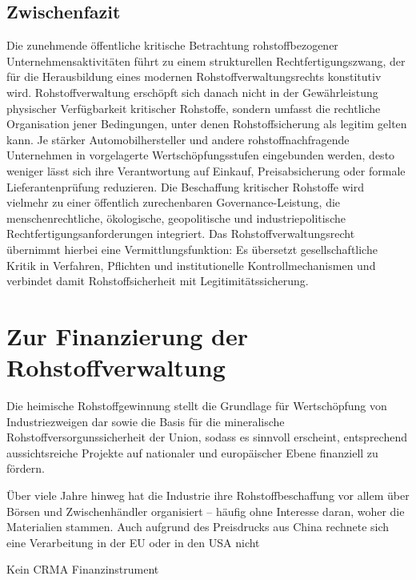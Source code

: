 \documentclass[12pt,a4paper,oneside]{book} %
\begin{document}
{\subsection{Zwischenfazit}

Die zunehmende öffentliche kritische Betrachtung rohstoffbezogener Unternehmensaktivitäten führt zu einem strukturellen Rechtfertigungszwang, der für die Herausbildung eines modernen Rohstoffverwaltungsrechts konstitutiv wird. Rohstoffverwaltung erschöpft sich danach nicht in der Gewährleistung physischer Verfügbarkeit kritischer Rohstoffe, sondern umfasst die rechtliche Organisation jener Bedingungen, unter denen Rohstoffsicherung als legitim gelten kann. Je stärker Automobilhersteller und andere rohstoffnachfragende Unternehmen in vorgelagerte Wertschöpfungsstufen eingebunden werden, desto weniger lässt sich ihre Verantwortung auf Einkauf, Preisabsicherung oder formale Lieferantenprüfung reduzieren. Die Beschaffung kritischer Rohstoffe wird vielmehr zu einer öffentlich zurechenbaren Governance-Leistung, die menschenrechtliche, ökologische, geopolitische und industriepolitische Rechtfertigungsanforderungen integriert. Das Rohstoffverwaltungsrecht übernimmt hierbei eine Vermittlungsfunktion: Es übersetzt gesellschaftliche Kritik in Verfahren, Pflichten und institutionelle Kontrollmechanismen und verbindet damit Rohstoffsicherheit mit Legitimitätssicherung.

\section{Zur Finanzierung der Rohstoffverwaltung}

Die heimische Rohstoffgewinnung stellt die Grundlage für Wertschöpfung von Industriezweigen dar sowie die Basis für die mineralische Rohstoffversorgunssicherheit der Union, sodass es sinnvoll erscheint, entsprechend aussichtsreiche Projekte auf nationaler und europäischer Ebene finanziell zu fördern.\autocite{Commodity Top News 73, S. 14}



Über viele Jahre hinweg hat die Industrie ihre Rohstoffbeschaffung vor allem über Börsen und Zwischenhändler organisiert – häufig ohne Interesse daran, woher die Materialien stammen.\autocite{https://www.africa-business-guide.de/de/praxis/erfahrungen/schluesselrolle-afrikas-bedeutung-bei-den-kritischen-rohstoffen--1920084} Auch aufgrund des Preisdrucks aus China rechnete sich eine Verarbeitung in der EU oder in den USA nicht

Kein CRMA Finanzinstrument

}
\end{document}

